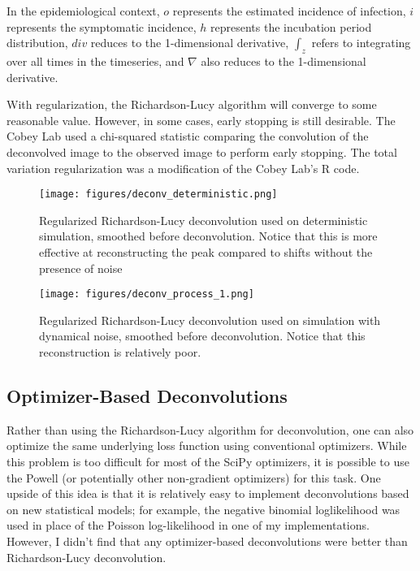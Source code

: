 \documentclass{article}
\begin{document}
In the epidemiological context, $o$ represents the estimated incidence of infection, $i$ represents the symptomatic incidence, $h$ represents the incubation period distribution, $div$ reduces to the 1-dimensional derivative,  $\int_z$ refers to integrating over all times in the timeseries, and $\nabla$ also reduces to the 1-dimensional derivative.

With regularization, the Richardson-Lucy algorithm will converge to some reasonable value. However, in some cases, early stopping is still desirable. The Cobey Lab used a chi-squared statistic comparing the convolution of the deconvolved image to the observed image to perform early stopping. The total variation regularization was a modification of the Cobey Lab's R code.

\clearpage
\begin{figure}[h!]
    \centering
    \texttt{[image: figures/deconv\_deterministic.png]}
    \caption{Regularized Richardson-Lucy deconvolution used on deterministic simulation, smoothed before deconvolution. Notice that this is more effective at reconstructing the peak compared to shifts without the presence of noise}
    \label{fig:my_label}
\end{figure}

\clearpage
\begin{figure}[h!]
    \centering
    \texttt{[image: figures/deconv\_process\_1.png]}
    \caption{Regularized Richardson-Lucy deconvolution used on simulation with dynamical noise, smoothed before deconvolution. Notice that this reconstruction is relatively poor.}
    \label{fig:my_label}
\end{figure}

\subsection{Optimizer-Based Deconvolutions}
Rather than using the Richardson-Lucy algorithm for deconvolution, one can also optimize the same underlying loss function using conventional optimizers. While this problem is too difficult for most of the SciPy optimizers, it is possible to use the Powell (or potentially other non-gradient optimizers) for this task. One upside of this idea is that it is relatively easy to implement deconvolutions based on new statistical models; for example, the negative binomial loglikelihood was used in place of the Poisson log-likelihood in one of my implementations. However, I didn't find that any optimizer-based deconvolutions were better than Richardson-Lucy deconvolution.
\end{document}
